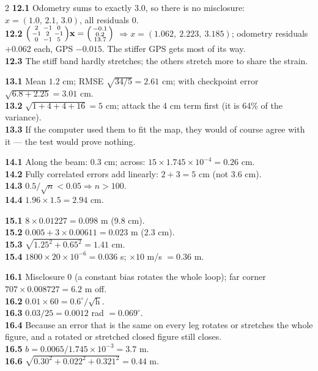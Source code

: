 \begin{multicols}{2}
\textbf{12.1} Odometry sums to exactly 3.0, so there is no misclosure: $x=(1.0,\,2.1,\,3.0)$, all residuals 0.\\
\textbf{12.2} $\begin{psmallmatrix}2&-1&0\\-1&2&-1\\0&-1&5\end{psmallmatrix}\mathbf{x}=\begin{psmallmatrix}-0.1\\0.2\\13.7\end{psmallmatrix}$ $\Rightarrow x=(1.062,\ 2.223,\ 3.185)$; odometry residuals $+0.062$ each, GPS $-0.015$. The stiffer GPS gets most of its way.\\
\textbf{12.3} The stiff band hardly stretches; the others stretch more to share the strain.

\textbf{13.1} Mean $1.2$ cm; RMSE $\sqrt{34/5}=2.61$ cm; with checkpoint error $\sqrt{6.8+2.25}=3.01$ cm.\\
\textbf{13.2} $\sqrt{1+4+4+16}=5$ cm; attack the 4 cm term first (it is 64\% of the variance).\\
\textbf{13.3} If the computer used them to fit the map, they would of course agree with it --- the test would prove nothing.

\textbf{14.1} Along the beam: 0.3 cm; across: $15\times1.745\times10^{-4}=0.26$ cm.\\
\textbf{14.2} Fully correlated errors add linearly: $2+3=5$ cm (not 3.6 cm).\\
\textbf{14.3} $0.5/\sqrt n<0.05\Rightarrow n>100$.\\
\textbf{14.4} $1.96\times1.5=2.94$ cm.

\textbf{15.1} $8\times0.01227=0.098$ m (9.8 cm).\\
\textbf{15.2} $0.005+3\times0.00611=0.023$ m (2.3 cm).\\
\textbf{15.3} $\sqrt{1.25^2+0.65^2}=1.41$ cm.\\
\textbf{15.4} $1800\times20\times10^{-6}=0.036$ s; $\times10$ m/s $=0.36$ m.

\textbf{16.1} Misclosure 0 (a constant bias rotates the whole loop); far corner $707\times0.008727=6.2$ m off.\\
\textbf{16.2} $0.01\times60=0.6^\circ/\sqrt{\text{h}}$.\\
\textbf{16.3} $0.03/25=0.0012$ rad $=0.069^\circ$.\\
\textbf{16.4} Because an error that is the same on every leg rotates or stretches the whole figure, and a rotated or stretched closed figure still closes.\\
\textbf{16.5} $b=0.0065/1.745\times10^{-3}=3.7$ m.\\
\textbf{16.6} $\sqrt{0.30^2+0.022^2+0.321^2}=0.44$ m.


\end{multicols}
